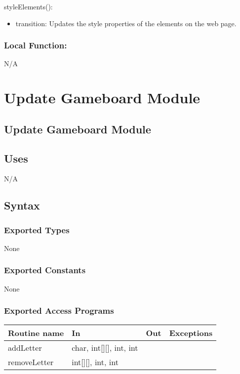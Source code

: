 \documentclass[12pt]{article}
\begin{document}
\noindent styleElements():
\begin{itemize}
  \item transition: Updates the style properties of the elements on the web page.
\end{itemize}

\subsubsection*{Local Function:}

N/A

\newpage

\section {Update Gameboard Module}

\subsection* {Update Gameboard Module}

\subsection* {Uses}

N/A

\subsection* {Syntax}

\subsubsection* {Exported Types}

None

\subsubsection* {Exported Constants}

None

\subsubsection* {Exported Access Programs}

\begin{tabular}{| l | l | l | p{6cm} |}
\hline
\textbf{Routine name} & \textbf{In} & \textbf{Out} & \textbf{Exceptions}\\
\hline
addLetter & char, int[][], int, int & ~ &  \\
\hline
removeLetter & int[][], int, int & ~ &  \\
\hline
\end{tabular}
\end{document}
